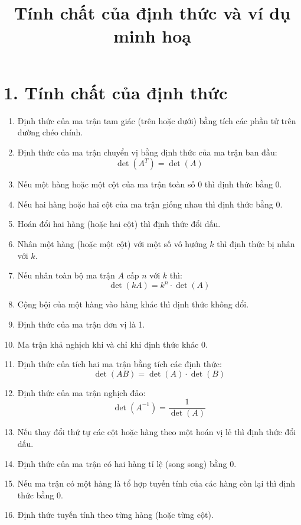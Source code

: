 \documentclass[a4paper,12pt]{article}
\title{\textbf{Tính chất của định thức và ví dụ minh hoạ}}
\author{}
\date{}
\begin{document}
    \maketitle

    \section*{1. Tính chất của định thức}
    \begin{enumerate}
        \item Định thức của ma trận tam giác (trên hoặc dưới) bằng tích các phần tử trên đường chéo chính.
        \item Định thức của ma trận chuyển vị bằng định thức của ma trận ban đầu: 
        \[
        \operatorname{det}(A^T) = \operatorname{det}(A)
        \]
        \item Nếu một hàng hoặc một cột của ma trận toàn số 0 thì định thức bằng 0.
        \item Nếu hai hàng hoặc hai cột của ma trận giống nhau thì định thức bằng 0.
        \item Hoán đổi hai hàng (hoặc hai cột) thì định thức đổi dấu.
        \item Nhân một hàng (hoặc một cột) với một số vô hướng \( k \) thì định thức bị nhân với \( k \).
        \item Nếu nhân toàn bộ ma trận \( A \) cấp \( n \) với \( k \) thì: 
        \[
        \operatorname{det}(kA) = k^n \cdot \operatorname{det}(A)
        \]
        \item Cộng bội của một hàng vào hàng khác thì định thức không đổi.
        \item Định thức của ma trận đơn vị là 1.
        \item Ma trận khả nghịch khi và chỉ khi định thức khác 0.
        \item Định thức của tích hai ma trận bằng tích các định thức:
        \[
        \operatorname{det}(AB) = \operatorname{det}(A) \cdot \operatorname{det}(B)
        \]
        \item Định thức của ma trận nghịch đảo:
        \[
        \operatorname{det}(A^{-1}) = \dfrac{1}{\operatorname{det}(A)}
        \]
        \item Nếu thay đổi thứ tự các cột hoặc hàng theo một hoán vị lẻ thì định thức đổi dấu.
        \item Định thức của ma trận có hai hàng tỉ lệ (song song) bằng 0.
        \item Nếu ma trận có một hàng là tổ hợp tuyến tính của các hàng còn lại thì định thức bằng 0.
        \item Định thức tuyến tính theo từng hàng (hoặc từng cột).
    \end{enumerate}
\end{document}
